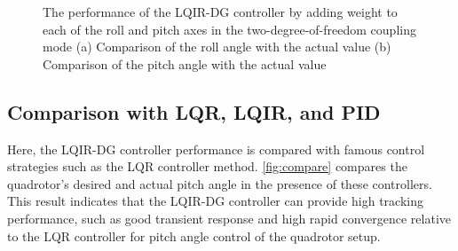 \documentclass[3p,times]{elsarticle}
\begin{document}
\begin{figure}[H]
	\centering
	\caption{The performance of the LQIR-DG controller by adding weight to each of the roll and pitch axes in the two-degree-of-freedom coupling mode (a) Comparison of the roll angle with the actual value (b) Comparison of the pitch angle with the actual value}
	\label{fig:weight}
\end{figure}

\subsection{Comparison with LQR, LQIR, and PID}
\noindent Here, the LQIR-DG controller performance is compared with famous control strategies such as the LQR controller method. \figurename{\ref{fig:compare}} compares the quadrotor's desired and actual pitch angle in the presence of these controllers. This result indicates that the LQIR-DG controller can provide high tracking performance, such as good transient response and high rapid convergence relative to the LQR controller for pitch angle control of the quadrotor setup.
\end{document}
